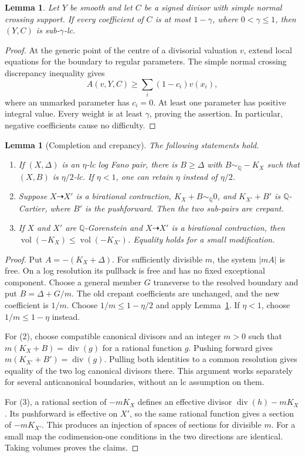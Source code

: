 \documentclass[11pt,reqno]{amsart}
\numberwithin{equation}{section}
\newtheorem{lemma}[theorem]{Lemma}
\theoremstyle{definition}
\theoremstyle{remark}
\newcommand{\Q}{\mathbb Q}
\newcommand{\simq}{\sim_{\Q}}
\newcommand{\vol}{\operatorname{vol}}
\newcommand{\Div}{\operatorname{div}}
\begin{document}
\begin{lemma}\label{lem:snc}
Let $Y$ be smooth and let $C$ be a signed divisor with simple normal crossing support. If every coefficient of $C$ is at most $1-\gamma$, where $0<\gamma\le1$, then $(Y,C)$ is sub-$\gamma$-lc.
\end{lemma}
\begin{proof}
At the generic point of the centre of a divisorial valuation $v$, extend local equations for the boundary to regular parameters. The simple normal crossing discrepancy inequality gives
\[
 A(v,Y,C)\ge\sum_i(1-c_i)v(x_i),
\]
where an unmarked parameter has $c_i=0$. At least one parameter has positive integral value. Every weight is at least $\gamma$, proving the assertion. In particular, negative coefficients cause no difficulty.
\end{proof}

\begin{lemma}[Completion and crepancy]\label{lem:book}
The following statements hold.
\begin{enumerate}
\item If $(X,\Delta)$ is an $\eta$-lc log Fano pair, there is $B\ge\Delta$ with $B\simq-K_X$ such that $(X,B)$ is $\eta/2$-lc. If $\eta<1$, one can retain $\eta$ instead of $\eta/2$.
\item Suppose $X\dashrightarrow X'$ is a birational contraction, $K_X+B\simq0$, and $K_{X'}+B'$ is $\Q$-Cartier, where $B'$ is the pushforward. Then the two sub-pairs are crepant.
\item If $X$ and $X'$ are $\Q$-Gorenstein and $X\dashrightarrow X'$ is a birational contraction, then $\vol(-K_X)\le\vol(-K_{X'})$. Equality holds for a small modification.
\end{enumerate}
\end{lemma}
\begin{proof}
Put $A=-(K_X+\Delta)$. For sufficiently divisible $m$, the system $|mA|$ is free. On a log resolution its pullback is free and has no fixed exceptional component. Choose a general member $G$ transverse to the resolved boundary and put $B=\Delta+G/m$. The old crepant coefficients are unchanged, and the new coefficient is $1/m$. Choose $1/m\le1-\eta/2$ and apply Lemma~\ref{lem:snc}. If $\eta<1$, choose $1/m\le1-\eta$ instead.

For (2), choose compatible canonical divisors and an integer $m>0$ such that $m(K_X+B)=\Div(g)$ for a rational function $g$. Pushing forward gives $m(K_{X'}+B')=\Div(g)$. Pulling both identities to a common resolution gives equality of the two log canonical divisors there. This argument works separately for several anticanonical boundaries, without an lc assumption on them.

For (3), a rational section of $-mK_X$ defines an effective divisor $\Div(h)-mK_X$. Its pushforward is effective on $X'$, so the same rational function gives a section of $-mK_{X'}$. This produces an injection of spaces of sections for divisible $m$. For a small map the codimension-one conditions in the two directions are identical. Taking volumes proves the claims.
\end{proof}
\end{document}
